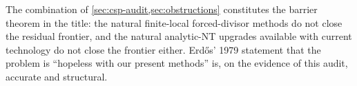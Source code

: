 \bigskip

The combination of \cref{sec:csp-audit,sec:obstructions} constitutes
the barrier theorem in the title: the natural finite-local
forced-divisor methods do not close the residual frontier, and the
natural analytic-NT upgrades available with current technology do
not close the frontier either. Erd\H{o}s' 1979 statement that the
problem is ``hopeless with our present methods'' is, on the
evidence of this audit, accurate and structural.

